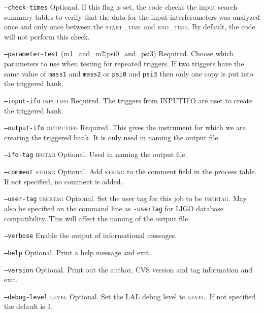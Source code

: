 \begin{entry}
\begin{entry}
\item[\texttt{--check-times}] Optional.  If this flag is set, the code checks
the input search summary tables to verify that the data for the input
interferometers was analyzed once and only once between the
\textsc{start\_time} and \textsc{end\_time}.  By default, the code will not
perform this check.

\item[\texttt{--parameter-test} (m1\_and\_m2|psi0\_and\_psi3)] Required. Choose
which parameters to use when testing for repeated triggers.  If two triggers
have the same value of \texttt{mass1} and \texttt{mass2} or \texttt{psi0} and
\texttt{psi3} then only one copy is put into the triggered bank.

\item[\texttt{--input-ifo} \textsc{inputifo}] Required. The triggers from
\textsc{INPUTIFO} are uset to create the triggered bank.

\item[\texttt{--output-ifo} \textsc{outputifo}] Required. This gives the
instrument for which we are creating the triggered bank.  It is only used in
naming the output file.

\item[\texttt{--ifo-tag} \textsc{ifotag}] Optional.  Used in naming the output
file.

\item[\texttt{--comment} \textsc{string}] Optional. Add \textsc{string}
to the comment field in the process table. If not specified, no comment
is added. 

\item[\texttt{--user-tag} \textsc{usertag}] Optional. Set the user tag for
this job to be \textsc{usertag}. May also be specified on the command line as
\texttt{-userTag} for LIGO database compatibility.  This will affect the
naming of the output file.

\item[\texttt{--verbose}] Enable the output of informational messages.

\item[\texttt{--help}] Optional.  Print a help message and exit.

\item[\texttt{--version}] Optional.  Print out the author, CVS version and
tag information and exit.

\item[\texttt{--debug-level} \textsc{level}] Optional. Set the LAL debug
level to \textsc{level}. If not specified the default is 1.


\end{entry}
\end{entry}
